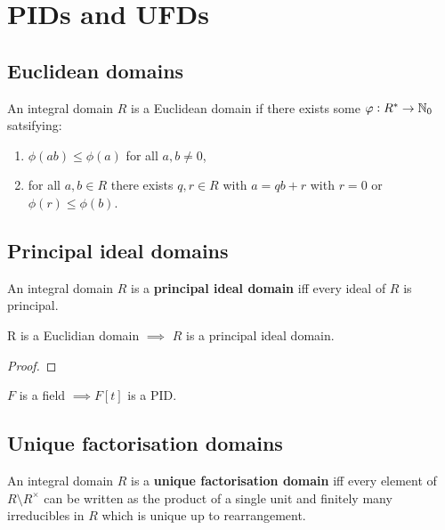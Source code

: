 \documentclass[../Year2.tex]{subfiles}
\begin{document}
\section{PIDs and UFDs}

\subsection{Euclidean domains}

\begin{definition}
    An integral domain $R$ is a Euclidean domain if there exists some  $\varphi:R^*\rightarrow\mathbb{N}_0$ satsifying: \begin{enumerate}
        \item $\phi(ab)\leq\phi(a)$ for all $a,b\neq 0$,
        \item for all $a,b\in R$ there exists $q,r\in R$ with $a=qb+r$ with $r=0$ or $\phi(r)\leq\phi(b)$.
    \end{enumerate}
\end{definition}

\subsection{Principal ideal domains}

\begin{definition}
    An integral domain $R$ is a \textbf{principal ideal domain} iff every ideal of $R$ is principal.
\end{definition}

\begin{theorem}
    R is a Euclidian domain $\implies$ $R$ is a principal ideal domain.
    \begin{proof}
        
    \end{proof}
\end{theorem}

\begin{corollary}
    $F$ is a field $\implies F[t]$ is a PID.
\end{corollary}

\subsection{Unique factorisation domains}

\begin{definition}
    An integral domain $R$ is a \textbf{unique factorisation domain} iff every element of $R\setminus R^\times$ can be written as the product of a single unit and finitely many irreducibles in $R$ which is unique up to rearrangement.
\end{definition}
\end{document}
